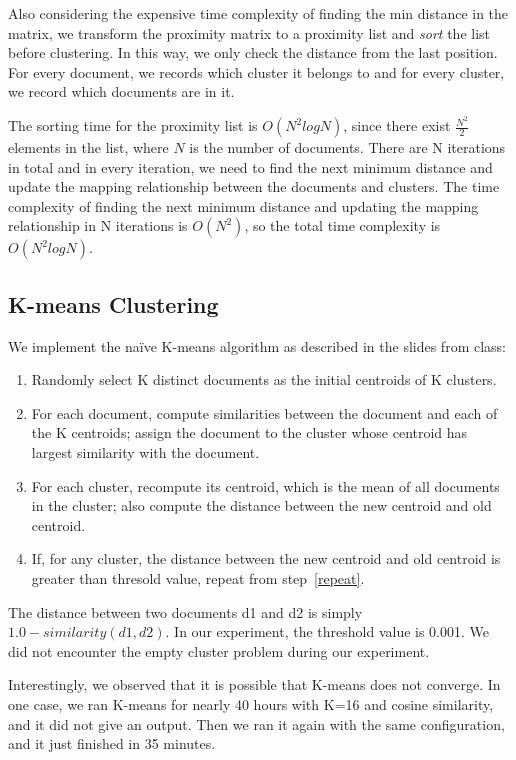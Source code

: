 \documentclass{article}
\begin{document}
Also considering the expensive time complexity of finding the min distance in
the matrix, we transform the proximity matrix to a proximity list and
\emph{sort} the list before clustering. In this way, we only check the
distance from the last position. For every document, we records which cluster it
belongs to and for every cluster, we record which documents are in it.

The sorting time for the proximity list is $O(N^2logN)$, since there exist
$\frac{N^2}{2}$ elements in the list, where $N$ is the number of documents.
There are N iterations in total and in every iteration, we need to find the next
minimum distance and update the mapping relationship between the documents and
clusters. The time complexity of finding the next minimum distance and updating
the mapping relationship in N iterations is $O(N^2)$, so the total time
complexity is $O(N^2logN)$.
\subsection{K-means Clustering}
We implement the na\"ive K-means algorithm as described in the slides from
class:
\begin{enumerate}
  \item Randomly select K distinct documents as the initial centroids of K
  clusters.
  \item \label{repeat} For each document, compute similarities between the
  document and each of the K centroids; assign the document to the cluster whose
  centroid has largest similarity with the document.
  \item For each cluster, recompute its centroid, which is the mean of all
  documents in the cluster; also compute the distance between the new centroid
  and old centroid.
  \item If, for any cluster, the distance between the new centroid and old
  centroid is greater than thresold value, repeat from step~\ref{repeat}. 
\end{enumerate}

\noindent The distance between two documents d1 and d2 is simply $1.0 -
similarity(d1, d2)$. In our experiment, the threshold value is 0.001. We did not
encounter the empty cluster problem during our experiment.

Interestingly, we observed that it is possible that K-means does not converge.
In one case, we ran K-means for nearly 40 hours with K=16 and cosine similarity,
and it did not give an output. Then we ran it again with the same configuration,
and it just finished in 35 minutes.
\end{document}
